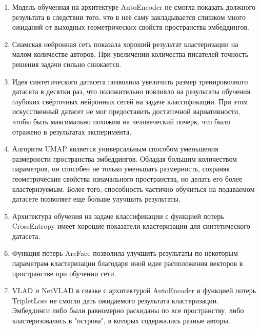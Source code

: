 \begin{enumerate}
    \item Модель обученная на архитектуре AutoEncoder не смогла показать должного результата в следствии того, что в неё саму закладывается слишком много ожиданий от выходных геометрических свойств пространства эмбеддингов.
    \item Сиамская нейронная сеть показала хороший результат кластеризации на малом количестве авторов. При увеличении количества писателей точность решения задачи сильно снижается.
    \item Идея синтетического датасета позволила увеличить размер тренировочного датасета в десятки раз, что положительно повлияло на результаты обучения глубоких свёрточных нейронных сетей на задаче классификации. При этом искусственный датасет не мог предоставить достаточной вариативности, чтобы быть максимально похожим на человеческий почерк, что было отражено в результатах эксперимента.
    \item Алгоритм UMAP является универсальным способом уменьшения размерности пространства эмбеддингов. Обладая большим количеством параметров, он способен не только уменьшать размерность, сохраняя геометрические свойства изначального пространства, но делать его более кластеризуемым. Более того, способность частично обучиться на подаваемом датасете позволяет еще больше улучшить результаты.
    \item Архитектура обучения на задаче классификации с функцией потерь CrossEntropy имеет хорошие показатели кластеризации для синтетического датасета.
    \item Функция потерь ArcFace позволила улучшить результаты по некоторым параметрам кластеризации благодаря иной идее расположения векторов в пространстве при обучении сети.
    \item VLAD и NetVLAD в связке с архитектурой AutoEncoder и функцией потерь TripletLoss не смогли дать ожидаемого результата кластеризации. Эмбеддинги либо были равномерно раскиданы по все пространству, либо кластеризовались в "острова", в которых содержались разные авторы.
\end{enumerate}
